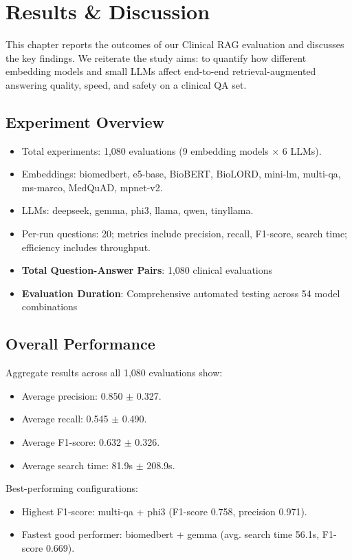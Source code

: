 \chapter{Results \& Discussion}
\label{chap:results}

\noindent This chapter reports the outcomes of our Clinical RAG evaluation and discusses the key findings. We reiterate the study aims: to quantify how different embedding models and small LLMs affect end-to-end retrieval-augmented answering quality, speed, and safety on a clinical QA set.

\section{Experiment Overview}
\begin{itemize}
  \item Total experiments: 1,080 evaluations (9 embedding models \(\times\) 6 LLMs).
  \item Embeddings: biomedbert, e5-base, BioBERT, BioLORD, mini-lm, multi-qa, ms-marco, MedQuAD, mpnet-v2.
  \item LLMs: deepseek, gemma, phi3, llama, qwen, tinyllama.
  \item Per-run questions: 20; metrics include precision, recall, F1-score, search time; efficiency includes throughput.
  \item \textbf{Total Question-Answer Pairs}: 1,080 clinical evaluations
  \item \textbf{Evaluation Duration}: Comprehensive automated testing across 54 model combinations
\end{itemize}
\newpage
\section{Overall Performance}
Aggregate results across all 1,080 evaluations show:
\begin{itemize}
  \item Average precision: 0.850 $\pm$ 0.327.
  \item Average recall: 0.545 $\pm$ 0.490.
  \item Average F1-score: 0.632 $\pm$ 0.326.
  \item Average search time: 81.9s $\pm$ 208.9s.
\end{itemize}

Best-performing configurations:
\begin{itemize}
  \item Highest F1-score: multi-qa + phi3 (F1-score 0.758, precision 0.971).
  \item Fastest good performer: biomedbert + gemma (avg. search time 56.1s, F1-score 0.669).
\end{itemize}
\newpage
